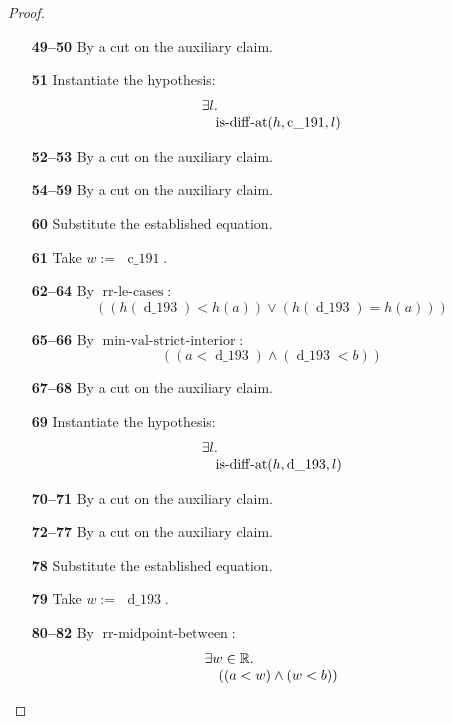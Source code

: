 \documentclass[11pt]{article}
\theoremstyle{plain}
\begin{document}
\begin{proof}
\begin{itemize}[leftmargin=2.8em, itemsep=4pt, parsep=1pt]
  \item[\textbf{49--50}] By a cut on the auxiliary claim.
  \item[\textbf{51}] Instantiate the hypothesis:
\begin{equation*}
\begin{array}{@{}l@{}} \exists l. \\ \quad \operatorname{is\text{-}diff\text{-}at}(h, \operatorname{c\_191}, l) \end{array}
\end{equation*}

  \item[\textbf{52--53}] By a cut on the auxiliary claim.
  \item[\textbf{54--59}] By a cut on the auxiliary claim.
  \item[\textbf{60}] Substitute the established equation.
  \item[\textbf{61}] Take $w :=$ $\operatorname{c\_191}$.
  \item[\textbf{62--64}] By $\operatorname{rr\text{-}le\text{-}cases}$:
\begin{equation*}
((h(\operatorname{d\_193}) < h(a)) \vee (h(\operatorname{d\_193}) = h(a)))
\end{equation*}

  \item[\textbf{65--66}] By $\operatorname{min\text{-}val\text{-}strict\text{-}interior}$:
\begin{equation*}
((a < \operatorname{d\_193}) \wedge (\operatorname{d\_193} < b))
\end{equation*}

  \item[\textbf{67--68}] By a cut on the auxiliary claim.
  \item[\textbf{69}] Instantiate the hypothesis:
\begin{equation*}
\begin{array}{@{}l@{}} \exists l. \\ \quad \operatorname{is\text{-}diff\text{-}at}(h, \operatorname{d\_193}, l) \end{array}
\end{equation*}

  \item[\textbf{70--71}] By a cut on the auxiliary claim.
  \item[\textbf{72--77}] By a cut on the auxiliary claim.
  \item[\textbf{78}] Substitute the established equation.
  \item[\textbf{79}] Take $w :=$ $\operatorname{d\_193}$.
  \item[\textbf{80--82}] By $\operatorname{rr\text{-}midpoint\text{-}between}$:
\begin{equation*}
\begin{array}{@{}l@{}} \exists w \in \mathbb{R}. \\ \quad ((a < w) \wedge (w < b)) \end{array}
\end{equation*}


\end{itemize}
\end{proof}
\end{document}
